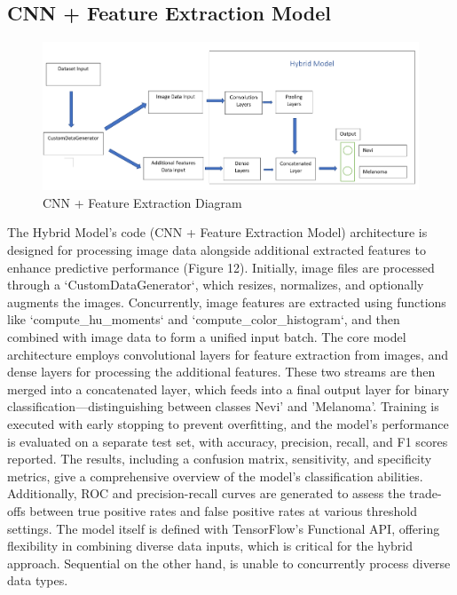 \documentclass[10pt,twocolumn]{article}
\begin{document}
\subsection{CNN + Feature Extraction Model}
\begin{figure}[h]
\caption{CNN + Feature Extraction Diagram}
\includegraphics[scale=0.4]{Hybrid Model Architecture.png}\newline
\end{figure}
The Hybrid Model's code (CNN + Feature Extraction Model) architecture is designed for processing image data alongside additional extracted features to enhance predictive performance (Figure 12). Initially, image files are processed through a `CustomDataGenerator`, which resizes, normalizes, and optionally augments the images. Concurrently, image features are extracted using functions like `compute\_hu\_moments` and `compute\_color\_histogram`, and then combined with image data to form a unified input batch. The core model architecture employs convolutional layers for feature extraction from images, and dense layers for processing the additional features. These two streams are then merged into a concatenated layer, which feeds into a final output layer for binary classification—distinguishing between classes Nevi' and 'Melanoma'.
\newline
Training is executed with early stopping to prevent overfitting, and the model's performance is evaluated on a separate test set, with accuracy, precision, recall, and F1 scores reported. The results, including a confusion matrix, sensitivity, and specificity metrics, give a comprehensive overview of the model's classification abilities. Additionally, ROC and precision-recall curves are generated to assess the trade-offs between true positive rates and false positive rates at various threshold settings.
\newline
The model itself is defined with TensorFlow's Functional API, offering flexibility in combining diverse data inputs, which is critical for the hybrid approach. Sequential on the other hand, is unable to concurrently process diverse data types. 


\printbibliography
\end{document}

